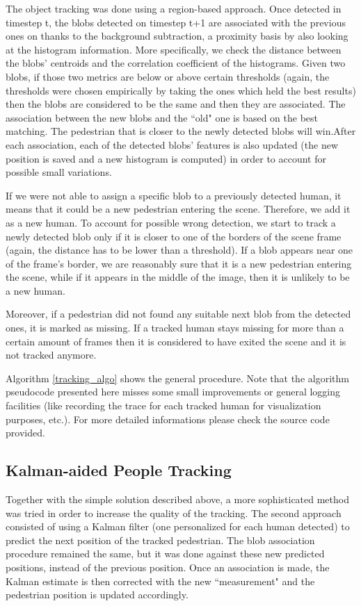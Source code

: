 \documentclass[runningheads]{llncs}
\begin{document}
The object tracking was done using a region-based approach. Once detected in timestep t, the blobs detected on timestep t+1 are associated with the previous ones on thanks to the background subtraction, a proximity basis by also looking at the histogram information. More specifically, we check the distance between the blobs' centroids and the correlation coefficient of the histograms. Given two blobs, if those two metrics are below or above certain thresholds (again, the thresholds were chosen empirically by taking the ones which held the best results) then the blobs are considered to be the same and then they are associated. The association between the new blobs and the ``old" one is based on the best matching. The pedestrian that is closer to the newly detected blobs will win.After each association, each of the detected blobs' features is also updated (the new position is saved and a new histogram is computed) in order to account for possible small variations.

If we were not able to assign a specific blob to a previously detected human, it means that it could be a new pedestrian entering the scene. Therefore, we add it as a new human. To account for possible wrong detection, we start to track a newly detected blob only if it is closer to one of the borders of the scene frame (again, the distance has to be lower than a threshold). If a blob appears near one of the frame's border, we are reasonably sure that it is a new pedestrian entering the scene, while if it appears in the middle of the image, then it is unlikely to be a new human.

Moreover, if a pedestrian did not found any suitable next blob from the detected ones, it is marked as missing. If a tracked human stays missing for more than a certain amount of frames then it is considered to have exited the scene and it is not tracked anymore.

Algorithm \ref{tracking_algo} shows the general procedure. Note that the algorithm pseudocode presented here misses some small improvements or general logging facilities (like recording the trace for each tracked human for visualization purposes, etc.).
For more detailed informations please check the source code provided.

\subsection{Kalman-aided People Tracking}

Together with the simple solution described above, a more sophisticated method was tried in order to increase the quality of the tracking. The second approach consisted of using a Kalman filter (one personalized for each human detected) to predict the next position of the tracked pedestrian. The blob association procedure remained the same, but it was done against these new predicted positions, instead of the previous position. Once an association is made, the Kalman estimate is then corrected with the new ``measurement" and the pedestrian position is updated accordingly.
\end{document}
